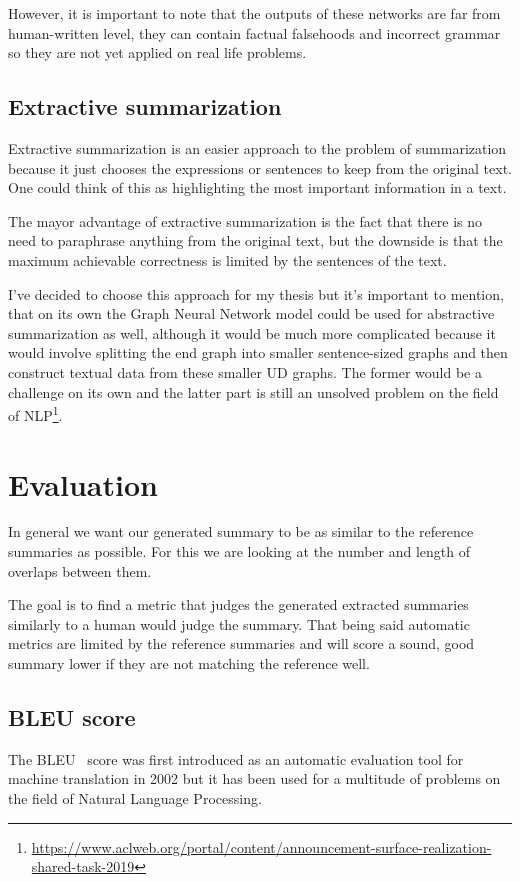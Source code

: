 However, it is important to note that the outputs of these networks are far from human-written level, they can contain factual falsehoods and incorrect grammar so they are not yet applied on real life problems.

\subsection{Extractive summarization}
Extractive summarization is an easier approach to the problem of summarization because it just chooses the expressions or sentences to keep from the original text. One could think of this as highlighting the most important information in a text.

The mayor advantage of extractive summarization is the fact that there is no need to paraphrase anything from the original text, but the downside is that the maximum achievable correctness is limited by the sentences of the text.

I've decided to choose this approach for my thesis but it's important to mention, that on its own the Graph Neural Network model could be used for abstractive summarization as well, although it would be much more complicated because it would involve splitting the end graph into smaller sentence-sized graphs and then construct textual data from these smaller UD graphs. The former would be a challenge on its own and the latter part is still an unsolved problem on the field of NLP\footnote{\url{https://www.aclweb.org/portal/content/announcement-surface-realization-shared-task-2019}}.

\section{Evaluation}
In general we want our generated summary to be as similar to the reference summaries as possible. For this we are looking at the number and length of overlaps between them.

The goal is to find a metric that judges the generated extracted summaries similarly to a human would judge the summary. That being said automatic metrics are limited by the reference summaries and will score a sound, good summary lower if they are not matching the reference well.

\subsection{BLEU score}
The BLEU~\cite{BLEU} score was first introduced as an automatic evaluation tool for machine translation in 2002 but it has been used for a multitude of problems on the field of Natural Language Processing.

